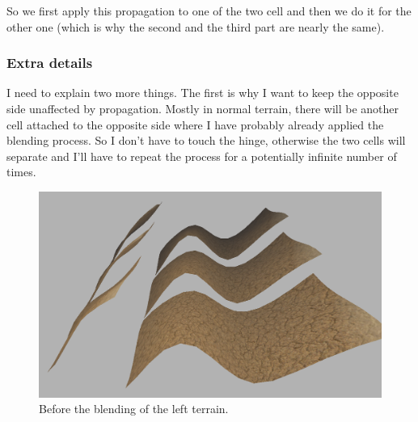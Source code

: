 \newpage

\noindent
So we first apply this propagation to one of the two cell and then we do it for the other one (which is why the second and the third part are nearly the same).

\begin{figure}[hbt!]
	\centering
	\qquad
	\caption{}
	\label{fig::thirdTerrain}
\end{figure}

\subsubsection{Extra details}
I need to explain two more things. The first is why I want to keep the opposite side unaffected by propagation. Mostly in normal terrain, there will be another cell attached to the opposite side where I have probably already applied the blending process. So I don't have to touch the hinge, otherwise the two cells will separate and I'll have to repeat the process for a potentially infinite number of times.

\begin{figure}[hbt!]
	\centering
	\includegraphics[width= 0.60
	\textwidth]{images/terrain6.png}
	\caption{Before the blending of the left terrain.}
\end{figure} 

